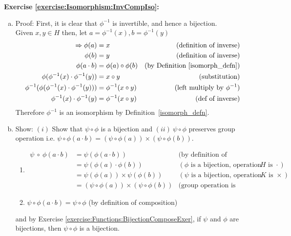 \noindent\textbf{Exercise \ref{exercise:Isomorphism:InvCompIso}:}
\\
\begin{enumerate}[(a)]
\item
Proof:  First, it is clear that $\phi^{-1}$ is invertible, and hence a bijection.
\\
Given $x, y \in H$ then, let $a = \phi^{-1}(x), b = \phi^{-1}(y)$
\begin{align*}
\implies \phi(a) &= x &\text{(definition of inverse)}
\\
\phi(b) &= y &\text{(definition of inverse)}
\\
\phi(a \cdot b) &= \phi(a) \circ \phi(b) &\text{(by Definition~\ref{isomorph_defn})}
\\
\phi(\phi^{-1}(x) \cdot \phi^{-1}(y)) &= x \circ y &\text{(substitution)}
\\
\phi^{-1}(\phi(\phi^{-1}(x) \cdot \phi^{-1}(y))) &= \phi^{-1}(x \circ y) &\text{(left multiply by\ } \phi^{-1})
\\
\phi^{-1}(x) \cdot \phi^{-1}(y) &= \phi^{-1}(x \circ y) &\text{(def of inverse)}
\end{align*}
Therefore $\phi^{-1}$ is an isomorphism by Definition~\ref{isomorph_defn}.
\\

\item
Show: $(i)$ Show that $\psi \circ \phi$ is a bijection and $(ii)\ \psi \circ \phi$ preserves group operation i.e. $\psi \circ \phi(a \cdot b) = (\psi \circ \phi(a)) \times (\psi \circ \phi(b))$.
	\begin{enumerate}[($i$)]
	\item
	\begin{align*}
	\psi \ \circ \ \phi(a \cdot b) &= \psi(\phi(a \cdot b)) &\text{(by definition of composition)}
	\\
	&=\psi(\phi(a) \cdot \phi(b)) &(\phi \text{\ is a bijection, operation of\ } H \text{\ is\ } \cdot)
	\\
	&= \psi(\phi(a)) \times \psi(\phi(b)) &(\psi \text{\ is a bijection, operation of\ } K \text{\ is\ } \times)
	\\
	&= (\psi \circ \phi(a)) \times (\psi \circ \phi(b)) &\text{(group operation is preserved)}
	\end{align*}

	\item
	$\psi \circ \phi(a \cdot b) = \psi \circ \phi$ \quad (by definition of composition)
	\end{enumerate}
and by Exercise \ref{exercise:Functions:BijectionComposeExer}, if $\psi$ and $\phi$ are bijections, then $\psi \circ \phi$ is a bijection.
\end{enumerate}

